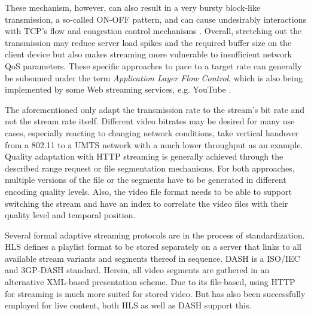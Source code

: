 These mechanism, however, can also result in a very bursty block-like transmission, a so-called ON-OFF pattern, and can cause undesirably interactions with \gls{TCP}'s flow and congestion control mechanisms . Overall, stretching out the transmission may reduce server load spikes and the required buffer size on the client device but also makes streaming more vulnerable to insufficient network \gls{QoS} parameters. These specific approaches to pace to a target rate can generally be subsumed under the term \textit{Application Layer Flow Control}, which is also being implemented by some Web streaming services, e.g. YouTube \cite{alcock2011afcyt,metzger2011delivery}.

The aforementioned only adapt the transmission rate to the stream's bit rate and not the stream rate itself. Different video bitrates may be desired for many use cases, especially reacting to changing network conditions, take vertical handover from a 802.11 to a \gls{UMTS} network with a much lower throughput as an example. Quality adaptation with \gls{HTTP} streaming is generally achieved through the described range request or file segmentation mechanisms. For both approaches, multiple versions of the file or the segments have to be generated in different encoding quality levels. Also, the video file format needs to be able to support switching the stream and have an index to correlate the video files with their quality level and temporal position. \cite{ma2011mobile, watching-video1}

Several formal adaptive streaming protocols are in the process of standardization. \gls{HLS} \cite{pantos2011livestreaming} defines a playlist format to be stored separately on a server that links to all available stream variants and segments thereof in sequence. \gls{DASH} \cite{Stockhammer:2011:DAS:1943552.1943572} is a \gls{ISO}/\gls{IEC} \cite{iso-iec-23009-1} and 3GP-DASH \cite{3gpp.26.247} standard. Herein, all video segments are gathered in an alternative XML-based presentation scheme. Due to its file-based, using \gls{HTTP} for streaming is much more suited for stored video. But has also been successfully employed for live content, both \gls{HLS} as well as \gls{DASH} support this.

